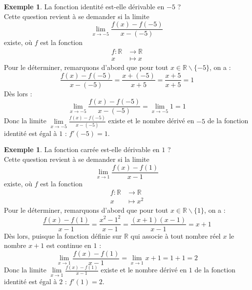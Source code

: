 \documentclass[a4paper,fontsize=13pt]{scrreprt}
\theoremstyle{plain}
\theoremstyle{definition}
\newtheorem{exe}[subsection]{Exemple}
\newcommand{\rr}{\mathbb{R}}
\begin{document}
\begin{exe}
	La fonction identité est-elle dérivable en $-5$ ? \\
	Cette question revient à se demander si la limite
	$$\lim\limits_{x\to -5} \frac{f(x)-f(-5)}{x-(-5)}$$
	existe, où $f$ est la fonction
	\begin{align*}
	f : \rr &\to \rr \\
	x &\mapsto x
	\end{align*}
	Pour le déterminer, remarquons d'abord que pour tout $x \in \rr \backslash \{-5\}$, on a :
	$$\frac{f(x)-f(-5)}{x-(-5)} = \frac{x+(-5)}{x+5} = \frac{x+5}{x+5} = 1$$
	Dès lors :
	$$\lim\limits_{x\to -5} \frac{f(x)-f(-5)}{x-(-5)} = \lim\limits_{x\to -5} 1=1$$
	Donc la limite $\lim\limits_{x\to -5} \frac{f(x)-f(-5)}{x-(-5)}$ existe et le nombre dérivé en $-5$ de la fonction identité est égal à $1$ : $f'(-5)=1$.
\end{exe}
\begin{exe}
	La fonction carrée est-elle dérivable en $1$ ? \\
	Cette question revient à se demander si la limite
	$$\lim\limits_{x\to 1} \frac{f(x)-f(1)}{x-1}$$
	existe, où $f$ est la fonction
	\begin{align*}
	f : \rr &\to \rr \\
	x &\mapsto x^2
	\end{align*}
	Pour le déterminer, remarquons d'abord que pour tout $x \in \rr \backslash \{1\}$, on a :
	$$\frac{f(x)-f(1)}{x-1} = \frac{x^2-1^2}{x-1} = \frac{(x+1)(x-1)}{x-1} = x+1$$
	Dès lors, puisque la fonction définie sur $\rr$ qui associe à tout nombre réel $x$ le nombre $x+1$ est continue en $1$ :
	$$\lim\limits_{x\to 1} \frac{f(x)-f(1)}{x-1}= \lim\limits_{x\to 1} x+1=1+1=2$$
	Donc la limite $\lim\limits_{x\to 1} \frac{f(x)-f(1)}{x-1}$ existe et le nombre dérivé en $1$ de la fonction identité est égal à $2$ : $f'(1)=2$.
\end{exe}
\end{document}
